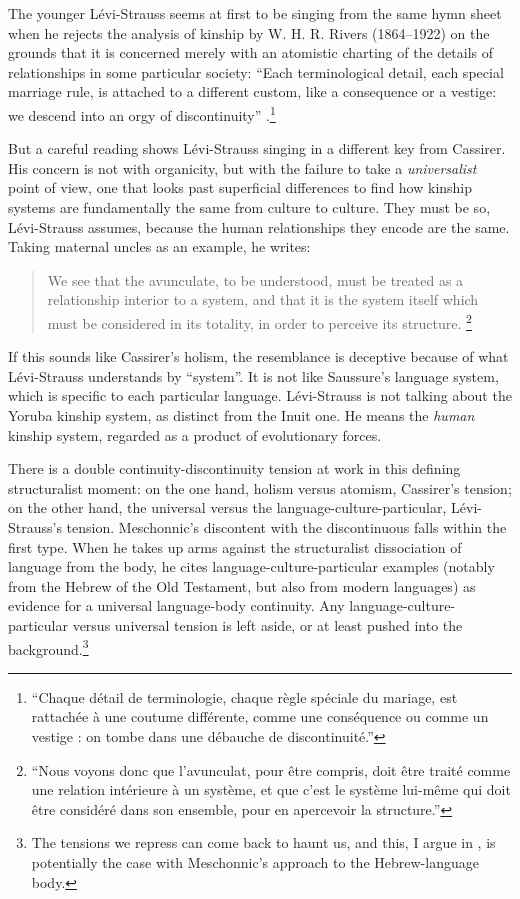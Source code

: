 \documentclass[output=paper]{langscibook}
\begin{document}
The younger Lévi-Strauss seems at first to be singing from the same hymn sheet when he rejects the analysis of kinship by W. H. R. Rivers (1864--1922) on the grounds that it is concerned merely with an atomistic charting of the details of relationships in some particular society: ``Each terminological detail, each special marriage rule, is attached to a different custom, like a consequence or a vestige: we descend into an orgy of discontinuity'' \citep[37]{LeviStrauss1945}.\footnote{``Chaque détail de terminologie, chaque règle spéciale du mariage, est rattachée à une coutume différente, comme une conséquence ou comme un vestige : on tombe dans une débauche de discontinuité.''}

But a careful reading shows Lévi-Strauss singing in a different key from Cassirer. His concern is not with organicity, but with the failure to take a \emph{universalist} point of view, one that looks past superficial differences to find how kinship systems are fundamentally the same from culture to culture. They must be so, Lévi-Strauss assumes, because the human relationships they encode are the same. Taking maternal uncles as an example, he writes:

\begin{quotation}
We see that the avunculate, to be understood, must be treated as a relationship interior to a system, and that it is the system itself which must be considered in its totality, in order to perceive its structure. \citep[47]{LeviStrauss1945}\footnote{``Nous voyons donc que l'avunculat, pour être compris, doit être traité comme une relation intérieure à un système, et que c'est le système lui-même qui doit être considéré dans son ensemble, pour en apercevoir la structure.''}
\end{quotation}

If this sounds like Cassirer's holism, the resemblance is deceptive because of what Lévi-Strauss understands by ``system''. It is not like Saussure's language system, which is specific to each particular language. Lévi-Strauss is not talking about the Yoruba kinship system, as distinct from the Inuit one. He means the \emph{human} kinship system, regarded as a product of evolutionary forces.

There is a double continuity-discontinuity tension at work in this defining structuralist moment: on the one hand, holism versus atomism, Cassirer's tension; on the other hand, the universal versus the language-culture-particular, Lévi-Strauss's tension. Meschonnic's discontent with the discontinuous falls within the first type. When he takes up arms against the structuralist dissociation of language from the body, he cites language-culture-particular examples (notably from the Hebrew of the Old Testament, but also from modern languages) as evidence for a universal language-body continuity. Any language-culture-particular versus universal tension is left aside, or at least pushed into the background.\footnote{The tensions we repress can come back to haunt us, and this, I argue in \citet{Joseph2018languagebody}, is potentially the case with Meschonnic's approach to the Hebrew-language body.} 
\end{document}
